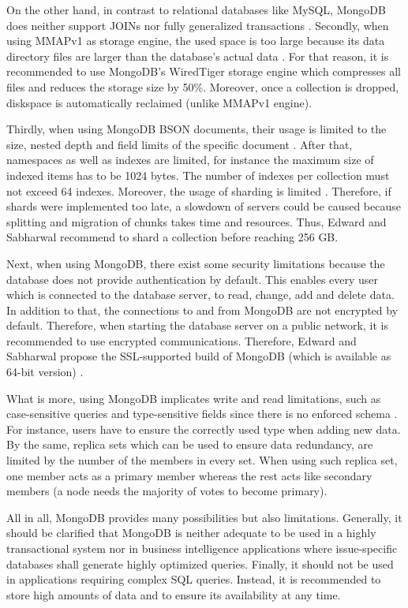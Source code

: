 On the other hand, in contrast to relational databases like MySQL, MongoDB does neither support JOINs nor fully generalized transactions \cite[p.25 ff.]{mongodb_edward}. Secondly, when using MMAPv1 as storage engine, the used space is too large because its data directory files are larger than the database's actual data \cite[p.226 ff.]{mongodb_edward}. For that reason, it is recommended to use MongoDB's WiredTiger storage engine which compresses all files and reduces the storage size by 50\%. Moreover, once a collection is dropped, diskspace is automatically reclaimed (unlike MMAPv1 engine).

Thirdly, when using MongoDB BSON documents, their usage is limited to the size, nested depth and field limits of the specific document \cite[p.228 ff.]{mongodb_edward}. After that, namespaces as well as indexes are limited, for instance the maximum size of indexed items has to be 1024 bytes. The number of indexes per collection must not exceed 64 indexes. Moreover, the usage of sharding is limited \cite[p.230 ff.]{mongodb_edward}. Therefore, if shards were implemented too late, a slowdown of servers could be caused because splitting and migration of chunks takes time and resources. Thus, Edward and Sabharwal recommend to shard a collection before reaching 256 \ac{GB}. 

Next, when using MongoDB, there exist some security limitations because the database does not provide authentication by default. This enables every user which is connected to the database server, to read, change, add and delete data. In addition to that, the connections to and from MongoDB are not encrypted by default. Therefore, when starting the database server on a public network, it is recommended to use encrypted communications. Therefore, Edward and Sabharwal propose the SSL-supported build of MongoDB (which is available as 64-bit version) \cite[p.230 ff.]{mongodb_edward}. 

What is more, using MongoDB implicates write and read limitations, such as case-sensitive queries and type-sensitive fields since there is no enforced schema \cite[p.231 ff.]{mongodb_edward}. For instance, users have to ensure the correctly used type when adding new data. By the same, replica sets which can be used to ensure data redundancy, are limited by the number of the members in every set. When using such replica set, one member acts as a primary member whereas the rest acts like secondary members (a node needs the majority of votes to become primary).

All in all, MongoDB provides many possibilities but also limitations. Generally, it should be clarified that MongoDB is neither adequate to be used in a highly transactional system nor in business intelligence applications where issue-specific databases shall generate highly optimized queries. Finally, it should not be used in applications requiring complex SQL queries. Instead, it is recommended to store high amounts of data and to ensure its availability at any time. 

